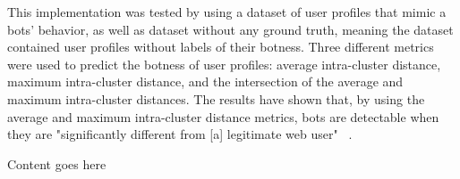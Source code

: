 This implementation was tested by using a dataset of user profiles that mimic a bots' behavior, as well as dataset without any ground truth, meaning the dataset contained user profiles without labels of their botness.
Three different metrics were used to predict the botness of user profiles: average intra-cluster distance, maximum intra-cluster distance, and the intersection of the average and maximum intra-cluster distances.
The results have shown that, by using the average and maximum intra-cluster distance metrics, bots are detectable when they are "significantly different from [a] legitimate web user" ~\cite{particle_swarm}.

Content goes here~\cite{optimized_outlier_bot_detection}
